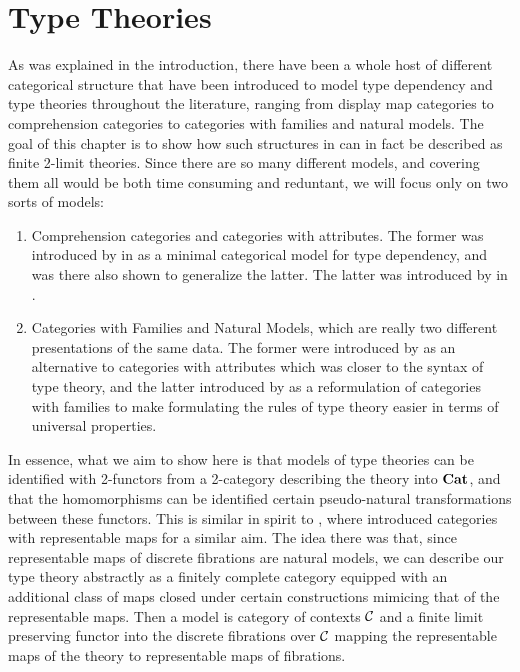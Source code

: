 \documentclass[../thesis.tex]{subfiles}
\begin{document}
\chapter{Type Theories}\label{ch:type theories}
As was explained in the introduction, there have been a whole host of different categorical structure
that have been introduced to model type dependency and type theories throughout the literature, ranging
from display map categories to comprehension categories to categories with families and natural models.
The goal of this chapter is to show how such structures in can in fact be described as finite 2-limit
theories. Since there are so many different models, and covering them all would be both time consuming
and reduntant, we will focus only on two sorts of models:
\begin{enumerate}
  \item Comprehension categories and categories with attributes. The former was introduced by \citeauthor{jacobs1993}
    in \cite{jacobs1993} as a minimal categorical model for type dependency, and was there also shown to generalize
    the latter. The latter was introduced by \citeauthor{cartmell1984} in \cite{cartmell1984}.
  \item Categories with Families and Natural Models, which are really two different presentations of the same data.
    The former were introduced by \citeauthor{dybjer1996} as an alternative to categories with attributes which was
    closer to the syntax of type theory, and the latter introduced by \citeauthor{awodey2017} as a reformulation of
    categories with families to make formulating the rules of type theory easier in terms of universal properties.
\end{enumerate}

In essence, what we aim to show here is that models of type theories can be identified with 2-functors from a
2-category describing the theory into ${\mathbf{Cat}}$, and that the homomorphisms can be identified certain pseudo-natural
transformations between these functors. This is similar in spirit to \cite{uemura2023}, where \citeauthor{uemura2023}
introduced categories with representable maps for a similar aim. The idea there was that, since representable maps of
discrete fibrations are natural models, we can describe our type theory abstractly as a finitely complete
category equipped with an additional class of maps closed under certain constructions mimicing that of
the representable maps. Then a model is category of contexts ${\mathcal{C}}$ and a finite limit preserving functor
into the discrete fibrations over ${\mathcal{C}}$ mapping the representable maps of the theory to representable
maps of fibrations. 
\end{document}
